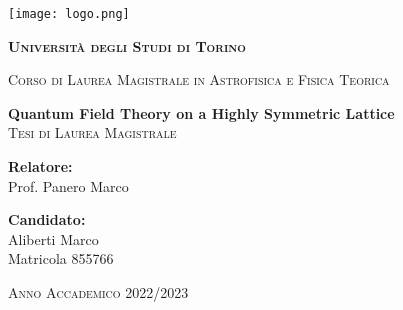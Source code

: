 \thispagestyle{empty}
\begin{center}
    \texttt{[image: logo.png]}
    \vspace{0.5cm}\\
    {\bfseries\scshape\LARGE Università degli Studi di Torino \par}
	\vspace{0,3cm}
	{\scshape\large Corso di Laurea Magistrale in Astrofisica e Fisica Teorica\par}
    \vspace{2cm}
	{\LARGE\bfseries Quantum Field Theory on a Highly Symmetric Lattice}
	\vspace{0.3cm}\\
    {\scshape\Large Tesi di Laurea Magistrale}
	\vspace{0,5cm}
\end{center}
\vspace{2cm}
\begin{minipage}[t]{0.4\textwidth} %
    {\large{{\bf Relatore:}\\
        Prof. Panero Marco}}
\end{minipage}
\hfill
\begin{minipage}[t]{0.47\textwidth}\raggedleft %
    {\large{{\bf Candidato:}\\
        Aliberti Marco\\
        Matricola 855766}}
    \vspace{12mm}
\end{minipage}
\hfill
\vspace{18mm}
\begin{center} %
    \large{\scshape Anno Accademico 2022/2023}
\end{center}
